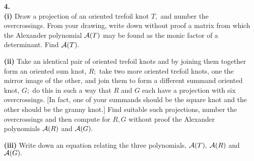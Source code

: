 \documentclass[12pt]{article}
\begin{document}
\newpage
{\large\bf 4.}\\
{\large\bf (i)}
Draw a projection of an oriented trefoil knot $T,$ and number the overcrossings. From
your drawing, write down without proof
a matrix from which the Alexander polynomial ${\cal A}(T)$
may be found as the monic factor of a determinant. Find ${\cal A}(T).$

{\large\bf (ii)}
Take an identical pair of oriented trefoil knots and by joining them together
form an oriented sum knot, $R;$
take two more oriented trefoil knots, one the mirror image of
the other, and join them to form a different
summand oriented knot, $G;$ do this in such a way that $R$ and $G$ each have
a projection with six overcrossings. [In fact, one of your summands should be
the square knot and the other should be the granny knot.]
Find suitable
such projections, number the overcrossings and then compute for $R,G$ without proof
the Alexander polynomials ${\cal A}(R)$ and ${\cal A}(G).$

{\large\bf (iii)}
Write down an equation relating the three polynomials,
${\cal A}(T),$ ${\cal A}(R)$ and ${\cal A}(G).$
\end{document}
